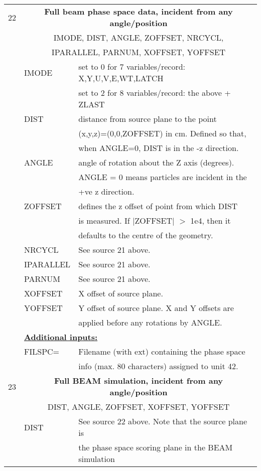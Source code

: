 \begin{longtable}{lll}
\hline
22&\multicolumn{2}{c}{\bf Full beam phase space data, incident from any angle/position}\\
  &\multicolumn{2}{c}{IMODE, DIST, ANGLE, ZOFFSET, NRCYCL,}\\
  &\multicolumn{2}{c}{IPARALLEL, PARNUM, XOFFSET, YOFFSET}\\
  & IMODE & set to 0 for 7 variables/record: X,Y,U,V,E,WT,LATCH \\
  &  & set to 2 for 8 variables/record: the above + ZLAST \\
  & DIST & distance from source plane to the point\\
  &      & (x,y,z)=(0,0,ZOFFSET) in cm.  Defined so that,\\
  &      &  when ANGLE=0, DIST is in the -z direction.\\
  & ANGLE & angle of rotation about the Z axis (degrees).  \\ 
  &       &  ANGLE = 0 means particles are incident in the \\
  &       & +ve z direction.\\
  & ZOFFSET & defines the z offset of point from which DIST\\
  &         &  is measured. If $|$ZOFFSET$|$ $>$ 1e4, then it\\
  &         & defaults to the centre of the geometry.\\
  & NRCYCL & See source 21 above.\\
  & IPARALLEL & See source 21 above.\\
  & PARNUM & See source 21 above.\\
  & XOFFSET & X offset of source plane.\\
  & YOFFSET & Y offset of source plane.  X and Y offsets are\\
  &         & applied before any rotations by ANGLE.\\ 
& \multicolumn{2}{l}{\bf \underline {Additional inputs:}}\\
  & FILSPC=  & Filename (with ext) containing the phase space\\
  &         & info (max. 80 characters) assigned  to unit 42.\\
\hline
23&\multicolumn{2}{c}{\bf Full BEAM simulation, incident from any angle/position}\\
  &\multicolumn{2}{c}{DIST, ANGLE, ZOFFSET, XOFFSET, YOFFSET}\\
  & DIST & See source 22 above.  Note that the source plane is\\
  &      & the phase space scoring plane in the BEAM simulation\\

\end{longtable}
